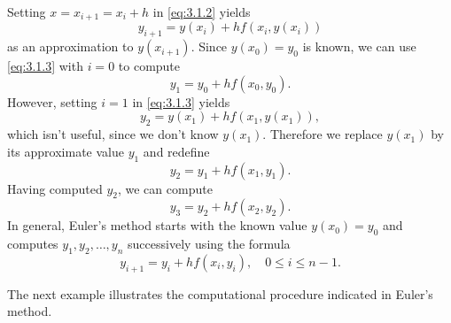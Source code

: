 \documentclass{ximera}
\begin{document}
Setting $x=x_{i+1}=x_i+h$ in \eqref{eq:3.1.2} yields
\begin{equation} \label{eq:3.1.3}
y_{i+1}=y(x_i)+hf(x_i,y(x_i))
\end{equation}
as an approximation to $y(x_{i+1})$. Since $y(x_0)=y_0$ is known, we
can use \eqref{eq:3.1.3} with $i=0$ to compute
$$
y_1=y_0+hf(x_0,y_0).
$$
However, setting $i=1$ in \eqref{eq:3.1.3} yields
$$
y_2=y(x_1)+hf(x_1,y(x_1)),
$$
which isn't  useful, since we don't know $y(x_1)$. Therefore
we replace $y(x_1)$ by its approximate value $y_1$ and redefine
$$
y_2=y_1+hf(x_1,y_1).
$$
Having computed $y_2$, we can  compute
$$
y_3=y_2+hf(x_2,y_2).
$$
In general, Euler's method starts with the known value $y(x_0)=y_0$
and computes $y_1, y_2, \ldots, y_n$ successively using the
 formula
\begin{equation} \label{eq:3.1.4}
y_{i+1}=y_i+hf(x_i,y_i),\quad 0\le i\le n-1.
\end{equation}

The next example illustrates the computational procedure
indicated in Euler's method.
\end{document}
